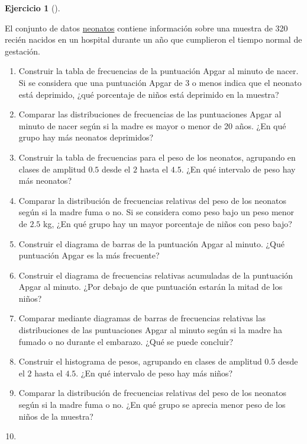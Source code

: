 \documentclass[
  spanish,
  a4paper,
]{scrreport}
\theoremstyle{definition}
\newtheorem{exercise}{Ejercicio}[chapter]
\theoremstyle{remark}
\begin{document}
\begin{exercise}[]\protect\hypertarget{exr-frecuencias-graficos-neonatos}{}\label{exr-frecuencias-graficos-neonatos}

El conjunto de datos \href{datos/neonatos.csv}{neonatos} contiene
información sobre una muestra de 320 recién nacidos en un hospital
durante un año que cumplieron el tiempo normal de gestación.

\begin{enumerate}
\def\labelenumi{\alph{enumi}.}
\item
  Construir la tabla de frecuencias de la puntuación Apgar al minuto de
  nacer. Si se considera que una puntuación Apgar de 3 o menos indica
  que el neonato está deprimido, ¿qué porcentaje de niños está deprimido
  en la muestra?
\item
  Comparar las distribuciones de frecuencias de las puntuaciones Apgar
  al minuto de nacer según si la madre es mayor o menor de 20 años. ¿En
  qué grupo hay más neonatos deprimidos?
\item
  Construir la tabla de frecuencias para el peso de los neonatos,
  agrupando en clases de amplitud \(0.5\) desde el \(2\) hasta el
  \(4.5\). ¿En qué intervalo de peso hay más neonatos?
\item
  Comparar la distribución de frecuencias relativas del peso de los
  neonatos según si la madre fuma o no. Si se considera como peso bajo
  un peso menor de \(2.5\) kg, ¿En qué grupo hay un mayor porcentaje de
  niños con peso bajo?
\item
  Construir el diagrama de barras de la puntuación Apgar al minuto. ¿Qué
  puntuación Apgar es la más frecuente?
\item
  Construir el diagrama de frecuencias relativas acumuladas de la
  puntuación Apgar al minuto. ¿Por debajo de que puntuación estarán la
  mitad de los niños?
\item
  Comparar mediante diagramas de barras de frecuencias relativas las
  distribuciones de las puntuaciones Apgar al minuto según si la madre
  ha fumado o no durante el embarazo. ¿Qué se puede concluir?
\item
  Construir el histograma de pesos, agrupando en clases de amplitud
  \(0.5\) desde el \(2\) hasta el \(4.5\). ¿En qué intervalo de peso hay
  más niños?
\item
  Comparar la distribución de frecuencias relativas del peso de los
  neonatos según si la madre fuma o no. ¿En qué grupo se aprecia menor
  peso de los niños de la muestra?
\item

\end{enumerate}
\end{exercise}
\end{document}
